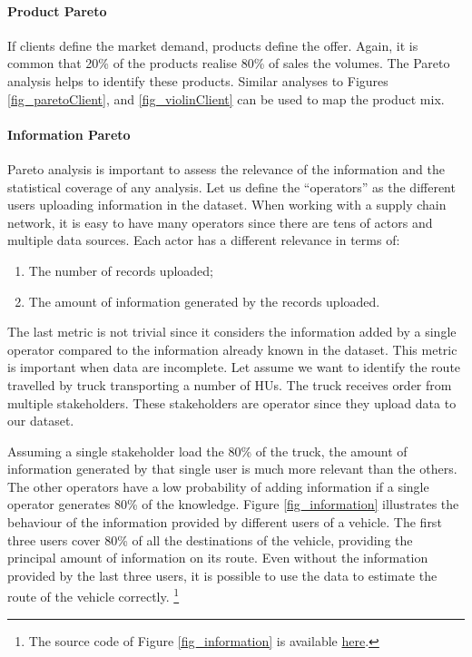 \paragraph{Product Pareto}

If clients define the market demand, products define the offer. Again, it is common that 20\% of the products realise 80\% of sales the volumes. The Pareto analysis helps to identify these products. Similar analyses to Figures \ref{fig_paretoClient}, and \ref{fig_violinClient} can be used to map the product mix.

\paragraph{Information Pareto}
Pareto analysis is important to assess the relevance of the information and the statistical coverage of any analysis. Let us define the “operators” as the different users uploading information in the dataset. When working with a supply chain network, it is easy to have many operators since there are tens of actors and multiple data sources. Each actor has a different relevance in terms of:

\begin{enumerate}
    \item The number of records uploaded;
    \item The amount of information generated by the records uploaded.
\end{enumerate}

The last metric is not trivial since it considers the information added by a single operator compared to the information already known in the dataset. This metric is important when data are incomplete. Let assume we want to identify the route travelled by truck transporting a number of HUs. The truck receives order from multiple stakeholders. These stakeholders are operator since they upload data to our dataset.\par 

Assuming a single stakeholder load the 80\% of the truck, the amount of information generated by that single user is much more relevant than the others. The other operators have a low probability of adding information if a single operator generates 80\% of the knowledge. Figure \ref{fig_information} illustrates the behaviour of the information provided by different users of a vehicle. The first three users cover 80\% of all the destinations of the vehicle, providing the principal amount of information on its route. Even without the information provided by the last three users, it is possible to use the data to estimate the route of the vehicle correctly. \footnote{The source code of Figure \ref{fig_information} is available \href{https://github.com/aletuf93/logproj/blob/master/examples/DIST_01\%20Supply\%20Chain\%20Assessment.ipynb}{here}.}

